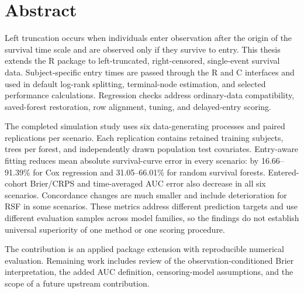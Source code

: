 \chapter*{Abstract}
Left truncation occurs when individuals enter observation after the origin of
the survival time scale and are observed only if they survive to entry. This
thesis extends the \pkg{} R package to left-truncated, right-censored,
single-event survival data. Subject-specific entry times are passed through
the R and C interfaces and used in default log-rank splitting, terminal-node
estimation, and selected performance calculations. Regression checks address
ordinary-data compatibility, saved-forest restoration, row alignment, tuning,
and delayed-entry scoring.

The completed simulation study uses six data-generating processes and
\SimReplications{} paired replications per scenario. Each replication contains
\SimTrainN{} retained training subjects, \SimTrees{} trees per forest, and
\SimTestN{} independently drawn population test covariates. Entry-aware fitting
reduces mean absolute survival-curve error in every scenario: by
16.66--91.39\% for Cox regression and 31.05--66.01\% for random survival forests.
Entered-cohort Brier/CRPS and time-averaged AUC error also decrease in all six
scenarios. Concordance changes are much smaller and include deterioration for
RSF in some scenarios. These metrics address different prediction targets and
use different evaluation samples across model families, so the findings do
not establish universal superiority of one method or one scoring procedure.

The contribution is an applied package extension with reproducible numerical
evaluation. Remaining work includes review of the observation-conditioned
Brier interpretation, the added AUC definition, censoring-model assumptions,
and the scope of a future upstream contribution.

